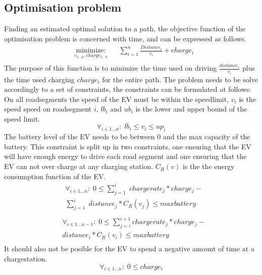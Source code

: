 \subsection{Optimisation problem}
Finding an estimated optimal solution to a path, the objective function of the optimisation problem is concerned with time, and can be expressed as follows.
\begin{equation}
\begin{aligned}
 & \underset{v_{1 \dots n},charge_{1 \dots n}}
{\text{minimize:}}
& & \sum_{i=1}^{n} \frac{Distance_i}{v_i} + charge_i \\
\end{aligned}
\end{equation}\label{eq:objfunction}
The purpose of this function is to minimize the time used on driving $\frac{distance_i}{v_i}$ plus the time used charging $charge_i$ for the entire path. 
The problem needs to be solve accordingly to a set of constraints, the constraints can be formulated at follows: \\
On all roadsegments the speed of the EV must be within the speedlimit, $v_i$ is the speed speed on roadsegment $i$, $lb_i$ and $ub_i$ is the lower and upper bound of the speed limit. 
\begin{equation}
\forall_{i \in 1 \dots n}: \; lb_i \leq v_i \leq up_i
\end{equation}
The battery level of the EV needs to be between $0$ and the max capacity of the battery. This constraint is split up in two constraints, one ensuring that the EV will have enough energy to drive each road segment and one ensuring that the EV can not over charge at any charging station. $C_R(v)$ is the the energy consumption function of the EV. 
\begin{equation}
\begin{aligned}
& \forall_{i \in 1 \dots n}: \; 0 \leq \sum_{j=1}^{i} \; chargerate_j*charge_j - \\
&  \sum_{j=1}^{i} \; distance_j*C_R(v_j) \leq maxbattery \\
 \end{aligned}
\end{equation}
\begin{equation}
\begin{aligned}
& \forall_{i \in 1 \dots n-1}: \; 0 \leq \sum_{j=i}^{i+1} chargerate_j*charge_j - \\
&   distance_i*C_R(v_i) \leq maxbattery \\
 \end{aligned}
\end{equation}
It should also not be posible for the EV to spend a negative amount of time at a chargestation.
\begin{equation}
\forall_{i \in 1 \dots n}: \; 0 \leq charge_i 
\end{equation}

